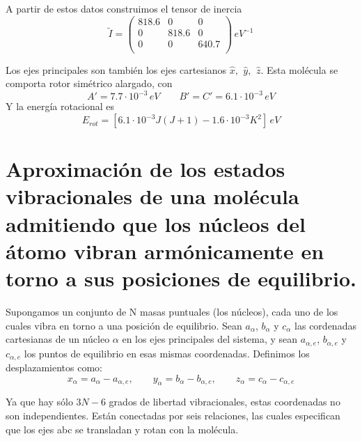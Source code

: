 \documentclass[a4paper]{article}
\begin{document}
 A partir de estos datos construimos el tensor de inercia
 $$ \tilde I =
 \begin{pmatrix}
 818.6 & 0 & 0 \\
 0 & 818.6 & 0 \\
 0 & 0 & 640.7\\
 \end{pmatrix}
 \, eV^{-1}
 $$
 
Los ejes principales son también los ejes cartesianos $ \hat x, \,\ \hat y, \,\ \hat z$. 
Esta molécula se comporta rotor simétrico alargado, con 
 $$A'= 7.7 \cdot 10^{-3}\, eV \qquad B' = C' = 6.1 \cdot 10^{-3}\, eV $$
 Y la energía rotacional es
 $$E_{rot}=[6.1\cdot 10^{-3}J(J+1) -1.6 \cdot 10^{-3}K^2] \, eV$$
\section{Aproximación de los estados vibracionales de una molécula admitiendo que los núcleos del átomo vibran armónicamente en torno a sus posiciones de equilibrio.}
Supongamos un conjunto de N masas puntuales (los núcleos), cada uno de los cuales vibra en torno a una posición de equilibrio. Sean $a_\alpha$, $b_\alpha$ y $c_\alpha$ las cordenadas cartesianas de un núcleo $\alpha$ en los ejes principales del sistema, y sean $a_{\alpha ,e}$, $b_{\alpha ,e}$ y $c_{\alpha ,e}$ los puntos de equilibrio en esas mismas coordenadas. Definimos los desplazamientos como:
\begin{equation}
x_\alpha = a_\alpha - a_{\alpha, e}, \qquad y_\alpha = b_\alpha - b_{\alpha, e}, \qquad z_\alpha = c_\alpha - c_{\alpha, e}
\end{equation}

Ya que hay sólo $3N-6$ grados de libertad vibracionales, estas coordenadas no son independientes. Están conectadas por seis relaciones, las cuales especifican que los ejes abc se transladan y rotan con la molécula.\\
\end{document}
